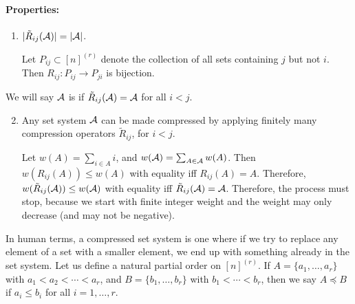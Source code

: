 \paragraph{Properties:}
\begin{enumerate}
	\item $|\tilde{R}_{ij}(\mathcal{A})| = |\mathcal{A}|$.

	Let $P_{ij} \subset [n]^{(r)}$ denote the collection of all sets containing $j$ but not $i$. Then $R_{ij}: P_{ij} \to P_{ji}$  is bijection.
\end{enumerate}


\noindent We will say $\mathcal{A}$ is  if $\tilde{R}_{ij}(\mathcal{A})= \mathcal{A}$ for all $i<j$.
\begin{enumerate}\setcounter{enumi}{1}
\item Any set system $\mathcal{A}$ can be made compressed by applying finitely many compression operators $\tilde{R}_{ij}$, for $i<j$.

Let $w(A) = \sum_{i\in A} i$, and $w(\mathcal{A}) = \sum_{A\in \mathcal{A}} w(A)$. Then $w(R_{ij}(A)) \leq w(A)$ with equality iff $R_{ij}(A)=A$. Therefore, $w(\tilde{R}_{ij}(\mathcal{A}))\leq w(\mathcal{A})$ with equality iff $\tilde{R}_{ij}(\mathcal{A}) = \mathcal{A}$. Therefore, the process must stop, because we start with finite integer weight and the weight may only decrease (and may not be negative).
\end{enumerate}


In human terms, a compressed set system is one where if we try to replace any element of a set with a smaller element, we end up with something already in the set system.
Let us define a natural partial order on $[n]^{(r)}$. If $A = \{a_1,\dotsc,a_r\}$ with $a_1 < a_2 < \dotsb < a_r$, and $B = \{b_1,\dotsc,b_r\}$ with $b_1<\dotsb < b_r$, then we say $A\preceq B$ if $a_i\leq b_i$ for all $i=1,\dotsc,r$.


